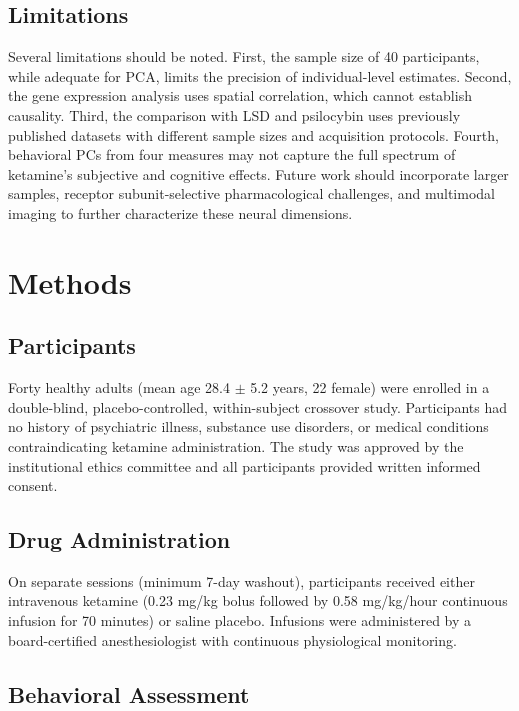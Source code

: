 \documentclass[11pt]{article}
\begin{document}
\subsection{Limitations}

Several limitations should be noted. First, the sample size of 40 participants, while adequate for PCA, limits the precision of individual-level estimates. Second, the gene expression analysis uses spatial correlation, which cannot establish causality. Third, the comparison with LSD and psilocybin uses previously published datasets with different sample sizes and acquisition protocols. Fourth, behavioral PCs from four measures may not capture the full spectrum of ketamine's subjective and cognitive effects. Future work should incorporate larger samples, receptor subunit-selective pharmacological challenges, and multimodal imaging to further characterize these neural dimensions.

\section{Methods}

\subsection{Participants}

Forty healthy adults (mean age 28.4 $\pm$ 5.2 years, 22 female) were enrolled in a double-blind, placebo-controlled, within-subject crossover study. Participants had no history of psychiatric illness, substance use disorders, or medical conditions contraindicating ketamine administration. The study was approved by the institutional ethics committee and all participants provided written informed consent.

\subsection{Drug Administration}

On separate sessions (minimum 7-day washout), participants received either intravenous ketamine (0.23 mg/kg bolus followed by 0.58 mg/kg/hour continuous infusion for 70 minutes) or saline placebo. Infusions were administered by a board-certified anesthesiologist with continuous physiological monitoring.

\subsection{Behavioral Assessment}
\end{document}
